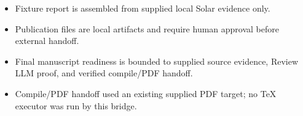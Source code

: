 \documentclass{article}
\begin{document}
\begin{itemize}\item Fixture report is assembled from supplied local Solar evidence only.\end{itemize}
\begin{itemize}\item Publication files are local artifacts and require human approval before external handoff.\end{itemize}
\begin{itemize}\item Final manuscript readiness is bounded to supplied source evidence, Review LLM proof, and verified compile/PDF handoff.\end{itemize}
\begin{itemize}\item Compile/PDF handoff used an existing supplied PDF target; no TeX executor was run by this bridge.\end{itemize}
\end{document}
